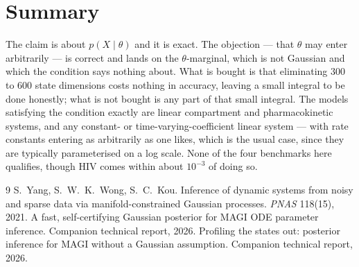 \documentclass[11pt]{article}
\theoremstyle{plain}
\theoremstyle{definition}
\theoremstyle{remark}
\begin{document}
\section{Summary}

The claim is about $p(X\mid\theta)$ and it is exact. The objection --- that $\theta$ may enter
arbitrarily --- is correct and lands on the $\theta$-marginal, which is not Gaussian and which the
condition says nothing about. What is bought is that eliminating $300$ to $600$ state dimensions
costs nothing in accuracy, leaving a small integral to be done honestly; what is not bought is any
part of that small integral. The models satisfying the condition exactly are linear compartment and
pharmacokinetic systems, and any constant- or time-varying-coefficient linear system --- with rate
constants entering as arbitrarily as one likes, which is the usual case, since they are typically
parameterised on a log scale. None of the four benchmarks here qualifies, though HIV comes within
about $10^{-3}$ of doing so.

\begin{thebibliography}{9}
\small
{} S.~Yang, S.~W.~K.~Wong, S.~C.~Kou.
  Inference of dynamic systems from noisy and sparse data via manifold-constrained Gaussian
  processes. \emph{PNAS} 118(15), 2021.
 A fast, self-certifying Gaussian posterior for MAGI ODE parameter inference.
  Companion technical report, 2026.
 Profiling the states out: posterior inference for MAGI without a Gaussian
  assumption. Companion technical report, 2026.
\end{thebibliography}
\end{document}
